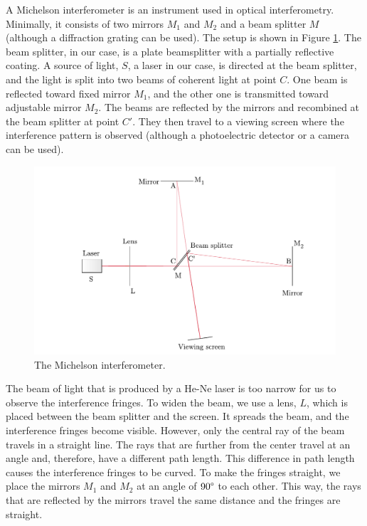 \documentclass[10pt]{article}
\begin{document}
A Michelson interferometer is an instrument used in optical interferometry. Minimally, it consists of two mirrors $M_1$ and $M_2$ and a beam splitter $M$ (although a diffraction grating can be used). The setup is shown in Figure \ref{fig:1}. The beam splitter, in our case, is a plate beamsplitter with a partially reflective coating. A source of light, $S$, a laser in our case, is directed at the beam splitter, and the light is split into two beams of coherent light at point $C$. One beam is reflected toward fixed mirror $M_1$, and the other one is transmitted toward adjustable mirror $M_2$. The beams are reflected by the mirrors and recombined at the beam splitter at point $C'$. They then travel to a viewing screen where the interference pattern is observed (although a photoelectric detector or a camera can be used).

\begin{figure}[hbt!]
  \centering
  \includegraphics[scale=0.6]{figures/f1.pdf}
  \caption{The Michelson interferometer.}
  \label{fig:1}
\end{figure}

The beam of light that is produced by a He-Ne laser is too narrow for us to observe the interference fringes. To widen the beam, we use a lens, $L$, which is placed between the beam splitter and the screen. It spreads the beam, and the interference fringes become visible. However, only the central ray of the beam travels in a straight line. The rays that are further from the center travel at an angle and, therefore, have a different path length. This difference in path length causes the interference fringes to be curved. To make the fringes straight, we place the mirrors $M_1$ and $M_2$ at an angle of $90\degree$ to each other. This way, the rays that are reflected by the mirrors travel the same distance and the fringes are straight. 
\end{document}
